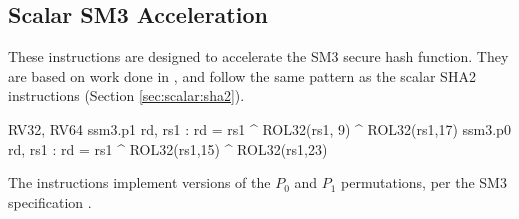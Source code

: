 
\subsection{Scalar SM3 Acceleration}
\label{sec:scalar:sm3}

These instructions are designed to accelerate the SM3 secure
hash function\cite{ietf:sm3}.
They are based on work done in \cite{MJS:LWSHA:20}, and follow
the same pattern as the scalar SHA2 instructions
(Section \ref{sec:scalar:sha2}).

\begin{cryptoisa}
RV32, RV64
    ssm3.p1 rd, rs1 : rd = rs1 ^ ROL32(rs1, 9) ^ ROL32(rs1,17)
    ssm3.p0 rd, rs1 : rd = rs1 ^ ROL32(rs1,15) ^ ROL32(rs1,23)
\end{cryptoisa}

The instructions implement versions of the $P_0$ and $P_1$
permutations, per the SM3 specification \cite{ietf:sm3}.

